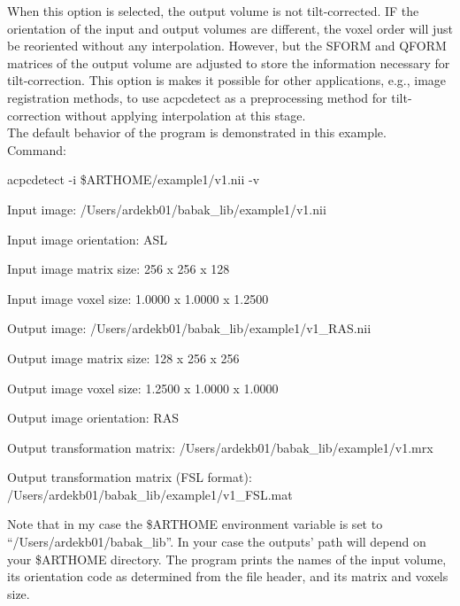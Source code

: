 \documentclass[11pt]{article}
\begin{document}

When this option is selected, the output volume is not tilt-corrected.  IF the
orientation of the input and output volumes are different, the voxel 
order will just be reoriented without any interpolation.  However, 
but the SFORM and QFORM matrices of the output volume are adjusted to store
the information necessary for tilt-correction.  This option is makes it
possible for other applications, e.g., image registration methods,
to use acpcdetect as a preprocessing method for tilt-correction
without applying interpolation at this stage.  \\ 

 The default behavior of the program is demonstrated in this example.\\
Command:

acpcdetect -i \$ARTHOME/example1/v1.nii -v


Input image: /Users/ardekb01/babak\_lib/example1/v1.nii

Input image orientation: ASL

Input image matrix size: 256 x 256 x 128

Input image voxel size: 1.0000 x 1.0000 x 1.2500

Output image: /Users/ardekb01/babak\_lib/example1/v1\_RAS.nii

Output image matrix size: 128 x 256 x 256

Output image voxel size: 1.2500 x 1.0000 x 1.0000

Output image orientation: RAS

Output transformation matrix: /Users/ardekb01/babak\_lib/example1/v1.mrx

Output transformation matrix (FSL format): /Users/ardekb01/babak\_lib/example1/v1\_FSL.mat 

\noindent
Note that in my case the \$ARTHOME environment variable is set to 
``/Users/ardekb01/babak\_lib''. In your case the outputs' path will depend on your 
\$ARTHOME directory.
The program prints the names of the input volume, its orientation code as determined from the file header,
and its matrix and voxels size.  
\end{document}
